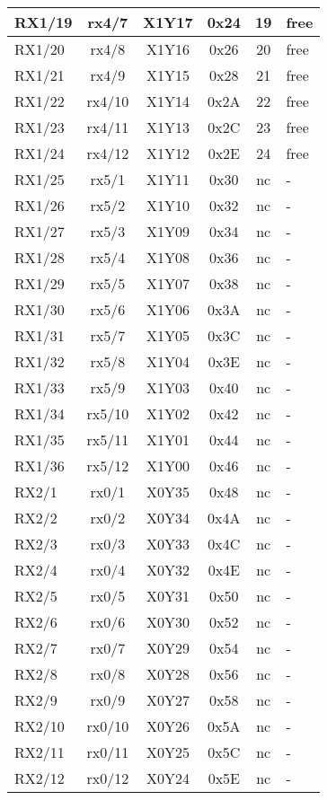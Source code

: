 \begin{longtable}{|l|c|c|c|c|l|}
RX1/19 & rx4/7  & X1Y17 & 0x24 & 19 & free\\\hline
RX1/20 & rx4/8  & X1Y16 & 0x26 & 20 & free\\\hline
RX1/21 & rx4/9  & X1Y15 & 0x28 & 21 & free\\\hline
RX1/22 & rx4/10 & X1Y14 & 0x2A & 22 & free\\\hline
RX1/23 & rx4/11 & X1Y13 & 0x2C & 23 & free\\\hline
RX1/24 & rx4/12 & X1Y12 & 0x2E & 24 & free\\\hline
RX1/25 & rx5/1  & X1Y11 & 0x30 & nc & -\\\hline
RX1/26 & rx5/2  & X1Y10 & 0x32 & nc & -\\\hline
RX1/27 & rx5/3  & X1Y09 & 0x34 & nc & -\\\hline
RX1/28 & rx5/4  & X1Y08 & 0x36 & nc & -\\\hline
RX1/29 & rx5/5  & X1Y07 & 0x38 & nc & -\\\hline
RX1/30 & rx5/6  & X1Y06 & 0x3A & nc & -\\\hline
RX1/31 & rx5/7  & X1Y05 & 0x3C & nc & -\\\hline
RX1/32 & rx5/8  & X1Y04 & 0x3E & nc & -\\\hline
RX1/33 & rx5/9  & X1Y03 & 0x40 & nc & -\\\hline
RX1/34 & rx5/10 & X1Y02 & 0x42 & nc & -\\\hline
RX1/35 & rx5/11 & X1Y01 & 0x44 & nc & -\\\hline
RX1/36 & rx5/12 & X1Y00 & 0x46 & nc & -\\\hline
RX2/1  & rx0/1  & X0Y35 & 0x48 & nc & -\\\hline
RX2/2  & rx0/2  & X0Y34 & 0x4A & nc & -\\\hline
RX2/3  & rx0/3  & X0Y33 & 0x4C & nc & -\\\hline
RX2/4  & rx0/4  & X0Y32 & 0x4E & nc & -\\\hline
RX2/5  & rx0/5  & X0Y31 & 0x50 & nc & -\\\hline
RX2/6  & rx0/6  & X0Y30 & 0x52 & nc & -\\\hline
RX2/7  & rx0/7  & X0Y29 & 0x54 & nc & -\\\hline
RX2/8  & rx0/8  & X0Y28 & 0x56 & nc & -\\\hline
RX2/9  & rx0/9  & X0Y27 & 0x58 & nc & -\\\hline
RX2/10 & rx0/10 & X0Y26 & 0x5A & nc & -\\\hline
RX2/11 & rx0/11 & X0Y25 & 0x5C & nc & -\\\hline
RX2/12 & rx0/12 & X0Y24 & 0x5E & nc & -\\\hline

\end{longtable}
